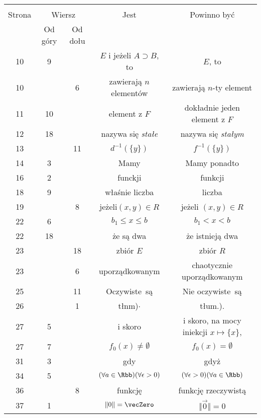 \documentclass[a4paper,11pt]{article}
\numberwithin{equation}{section}
\begin{document}
\begin{center}

  \begin{tabular}{|c|c|c|c|c|}
    \hline
    & \multicolumn{2}{c|}{} & & \\
    Strona & \multicolumn{2}{c|}{Wiersz} & Jest
                              & Powinno być \\ \cline{2-3}
    & Od góry & Od dołu & & \\
    \hline
    10  &  9 & & $E$ i jeżeli $A \supset B$, to & $E$, to \\
    10  & &  6 & zawierają $n$ elementów & zawierają $n$-ty element \\
    11  & 10 & & element z $F$ & dokładnie jeden element z $F$ \\
    12  & 18 & & nazywa się \textit{stałe} & nazywa się \textit{stałym} \\
    13  & & 11 & $d^{ -1 }( \{ y \} )$ & $f^{ -1 }( \{ y \} )$ \\
    14  &  3 & & Mamy & Mamy ponadto \\
    16  &  2 & & funckji & funkcji \\
    18  &  9 & & właśnie liczba & liczba \\
    19  & &  8 & jeżeli$( x, y ) \in R$ & jeżeli $( x, y ) \in R$ \\
    22  &  6 & & $b_{ 1 } \leq x \leq b$ & $b_{ 1 } < x < b$ \\
    22  & 18 & & że są dwa & że istnieją dwa \\
    23  & & 18 & zbiór $E$ & zbiór $R$ \\
    23  & &  6 & uporządkowanym & chaotycznie uporządkowanym \\
    25  & & 11 & Oczywiste~są & Nie oczywiste~są \\
    26  & &  1 & tłnm)$\cdot$ & tłum.). \\
    27  &  5 & & i skoro
           & i skoro, na mocy iniekcji $x \mapsto \{ x \}$, \\
    27  &  7 & & $f_{ 0 }( x ) \neq \emptyset$
           & $f_{ 0 }( x ) = \emptyset$ \\
    31  &  3 & & gdy & gdyż \\
    34  &  5 & & $( \forall a \in \Rbb ) ( \forall \epsilon > 0 )$
           & $( \forall \epsilon > 0 ) ( \forall a \in \Rbb )$ \\
    36  & &  8 & funkcję & funkcję rzeczywistą \\
    37  &  1 & & $\Vert 0 \Vert = \vecZero$ & $\Vert \vec{ 0 } \Vert = 0$ \\

\end{tabular}
\end{center}
\end{document}
